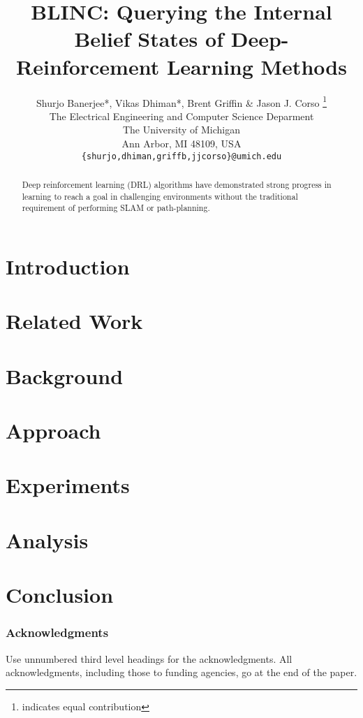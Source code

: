\documentclass{article} %
\title{BLINC: Querying the Internal Belief States of Deep-Reinforcement Learning Methods}
\author{Shurjo Banerjee*, Vikas Dhiman*, Brent Griffin \& Jason J. Corso \thanks{indicates equal contribution} \\
The Electrical Engineering and Computer Science Deparment\\
The University of Michigan\\
Ann Arbor, MI 48109, USA \\
\texttt{\{shurjo,dhiman,griffb,jjcorso\}@umich.edu} \\
}
\begin{document}
\maketitle

\begin{abstract}
Deep reinforcement learning (DRL) algorithms have demonstrated strong progress in learning to reach a goal in challenging environments without the traditional requirement of performing SLAM or path-planning. 

\end{abstract}

\section{Introduction}


\section{Related Work}


\section{Background}


\section{Approach}


\section{Experiments}


\section{Analysis}


\section{Conclusion}



\subsubsection*{Acknowledgments}

Use unnumbered third level headings for the acknowledgments. All
acknowledgments, including those to funding agencies, go at the end of the paper.




\end{document}
